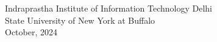   \author{Yaman K Singla}
  \vspace{0.5cm}
  \vfill
  \begin{center}
    \Large{Indraprastha Institute of Information Technology Delhi} \\
    \Large{State University of New York at Buffalo} \\
    \vspace{0.5cm}
    \Large{October, 2024}
  \end{center}










\newpage
 



 

 
  
  


